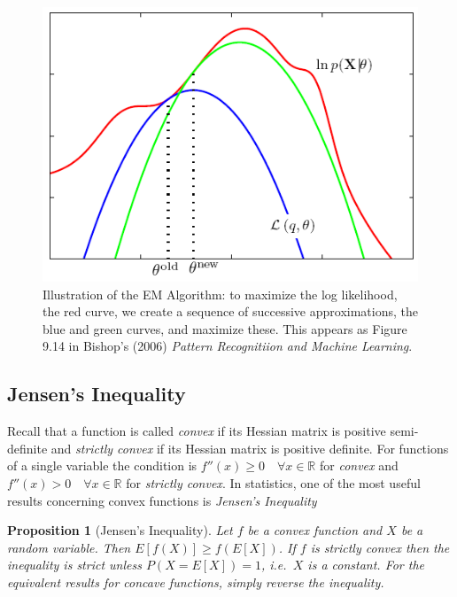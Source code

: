\documentclass[12pt]{article}
\newtheorem{pro}{Proposition}[section]
\theoremstyle{definition}
\begin{document}
\begin{figure}
	\centering
	\includegraphics[scale=0.5]{EM_algorithm}
	\caption{Illustration of the EM Algorithm: to maximize the log likelihood, the red curve, we create a sequence of successive approximations, the blue and green curves, and maximize these. This appears as Figure 9.14 in Bishop's (2006) \emph{Pattern Recognitiion and Machine Learning}.}
\end{figure}

\subsection{Jensen's Inequality}
Recall that a function is called \emph{convex} if its Hessian matrix is positive semi-definite and \emph{strictly convex} if its Hessian matrix is positive definite. For functions of a single variable the condition is $f''(x)\geq 0 \quad \forall x\in\mathbb{R}$ for \emph{convex} and $f''(x)> 0 \quad \forall x\in\mathbb{R}$ for \emph{strictly convex}. In statistics, one of the most useful results concerning convex functions is \emph{Jensen's Inequality}
\begin{pro}[Jensen's Inequality]
 	Let $f$ be a convex function and $X$ be a random variable. Then $E[f(X)]\geq f(E[X])$. If $f$ is strictly convex then the inequality is strict unless $P(X = E[X]) = 1$, i.e.\ $X$ is a constant. For the equivalent results for concave functions, simply reverse the inequality.
 \end{pro} 
\end{document}

